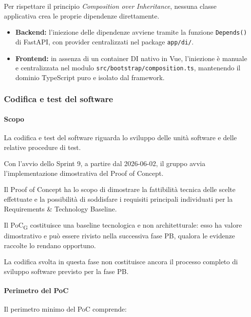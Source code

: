 Per rispettare il principio \textit{Composition over Inheritance}, nessuna classe applicativa crea le proprie dipendenze direttamente.
\begin{itemize}
    \item \textbf{Backend:} l'iniezione delle dipendenze avviene tramite la funzione \texttt{Depends()} di FastAPI, con provider centralizzati nel package \texttt{app/di/}.
    \item \textbf{Frontend:} in assenza di un container DI nativo in Vue, l'iniezione è manuale e centralizzata nel modulo \texttt{src/bootstrap/composition.ts}, mantenendo il dominio TypeScript puro e isolato dal framework.
\end{itemize}


\subsubsection{Codifica e test del software}

\paragraph{Scopo}

La codifica e test del software riguarda lo sviluppo delle unità software e delle relative procedure di test.


Con l'avvio dello Sprint 9, a partire dal 2026-06-02, il gruppo avvia
l'implementazione dimostrativa del Proof of Concept.

Il Proof of Concept ha lo scopo di dimostrare la fattibilità tecnica delle scelte
effettuate e la possibilità di soddisfare i requisiti principali individuati per
la Requirements \& Technology Baseline.

Il PoC\textsubscript{G} costituisce una baseline tecnologica e non architetturale: esso ha valore
dimostrativo e può essere rivisto nella successiva fase PB, qualora le
evidenze raccolte lo rendano opportuno.

La codifica svolta in questa fase non costituisce ancora il processo completo di
sviluppo software previsto per la fase PB.

\paragraph{Perimetro del PoC}

Il perimetro minimo del PoC comprende:

